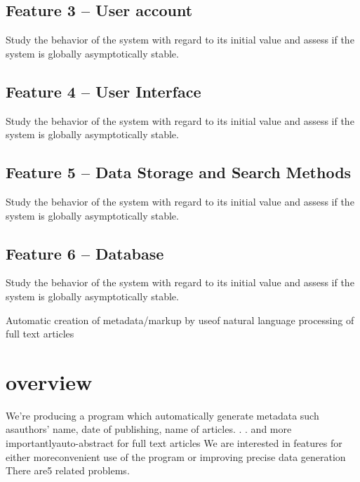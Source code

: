 \documentclass[a4paper]{article} %
\begin{document}
\subsection*{Feature 3 -- User account}
\label{task1:feature3}

Study the behavior of the system with regard to its initial value and assess if the system is globally asymptotically stable.

\subsection*{Feature 4 -- User Interface}
\label{task1:feature4}

Study the behavior of the system with regard to its initial value and assess if the system is globally asymptotically stable.

\subsection*{Feature 5 -- Data Storage and Search Methods}
\label{task1:feature5}

Study the behavior of the system with regard to its initial value and assess if the system is globally asymptotically stable.

\subsection*{Feature 6 -- Database}
\label{task1:feature6}

Study the behavior of the system with regard to its initial value and assess if the system is globally asymptotically stable.


Automatic creation of metadata/markup by useof natural language processing of full text articles

\section*{overview}
\label{task1}
We're  producing  a  program  which  automatically  generate  metadata  such  asauthors' name,  date of publishing,  name of articles. . .   and more importantlyauto-abstract for full text articles We are interested in features for either moreconvenient use of the program or improving precise data generation There are5 related problems.
\end{document}
